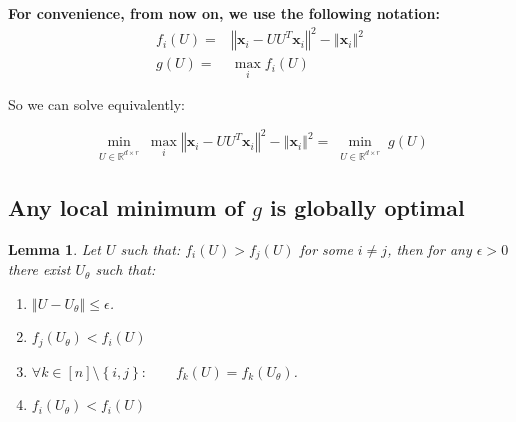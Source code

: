 \documentclass{article}
\newtheorem{lemma}[theorem]{Lemma}
\newcommand{\x}{{\mathbf x}}
\begin{document}
\textbf{For convenience, from now on, we use the following notation: 
\begin{align*}
    f_i(U)=&\left\Vert\x_{i}-UU^{T}\x_{i}\right\Vert^{2}-\left\Vert\x_{i}\right\Vert ^{2}\\
    g(U)=&\max_if_i(U)
\end{align*}
}

So we can solve equivalently:

\begin{equation} \label{factorized_problem_restore}
\min_{\begin{array}{c}
U\in\mathbb{R}^{d\times r}
\end{array}}\max_{i}\left\Vert \x_{i}-UU^T\x_{i}\right\Vert ^{2} - \left\Vert \x_{i}\right\Vert ^{2}=
\min_{\begin{array}{c}
U\in\mathbb{R}^{d\times r}
\end{array}}g(U)
\end{equation}


\subsection{Any local minimum of $g$ is globally optimal}

\begin{lemma} \label{not equal implies can improve}
Let $U$ such that: $f_i(U)>f_j(U)$ for some $i\ne j$, then for any $\epsilon>0$ there exist $U_{\theta}$ such that:
\begin{enumerate}
    \item $\left\Vert U-U_{\theta}\right\Vert \le\epsilon$.
    \item $f_j(U_{\theta})<f_i(U)$
    \item $\forall k\in[n]\setminus\left\{ i,j\right\} :\qquad f_k(U)=f_k(U_{\theta})$.
    \item $f_i(U_{\theta})<f_i(U)$
\end{enumerate}
\end{lemma}
\end{document}
